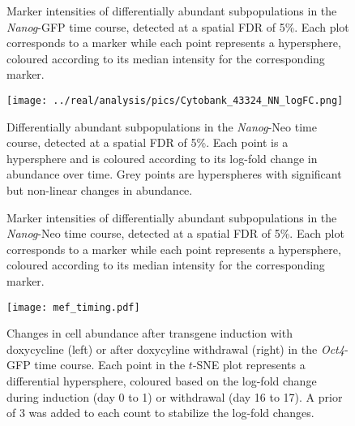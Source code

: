 \documentclass{article}
\begin{document}
\begin{figure}[p]
    \begin{center}
    \end{center}
    \caption{
        Marker intensities of differentially abundant subpopulations in the \textit{Nanog}-GFP time course, detected at a spatial FDR of 5\%.
        Each plot corresponds to a marker while each point represents a hypersphere, coloured according to its median intensity for the corresponding marker.
    }
\end{figure}

\begin{figure}[p]
    \begin{center}
    \texttt{[image: ../real/analysis/pics/Cytobank\_43324\_NN\_logFC.png]}
    \end{center}
    \caption{
        Differentially abundant subpopulations in the \textit{Nanog}-Neo time course, detected at a spatial FDR of 5\%.
        Each point is a hypersphere and is coloured according to its log-fold change in abundance over time.
        Grey points are hyperspheres with significant but non-linear changes in abundance.
    }
\end{figure}

\begin{figure}[p]
    \begin{center}
    \end{center}
    \caption{
        Marker intensities of differentially abundant subpopulations in the \textit{Nanog}-Neo time course, detected at a spatial FDR of 5\%.
        Each plot corresponds to a marker while each point represents a hypersphere, coloured according to its median intensity for the corresponding marker.
    }
\end{figure}

\begin{figure}[bt]
    \begin{center}
        \texttt{[image: mef\_timing.pdf]}
    \end{center}
    \caption{
        Changes in cell abundance after transgene induction with doxycycline (left) or after doxycyline withdrawal (right) in the \textit{Oct4}-GFP time course.
        Each point in the $t$-SNE plot represents a differential hypersphere, coloured based on the log-fold change during induction (day 0 to 1) or withdrawal (day 16 to 17).
        A prior of 3 was added to each count to stabilize the log-fold changes.
    }
    \label{fig:importanttime}
\end{figure}
\end{document}
